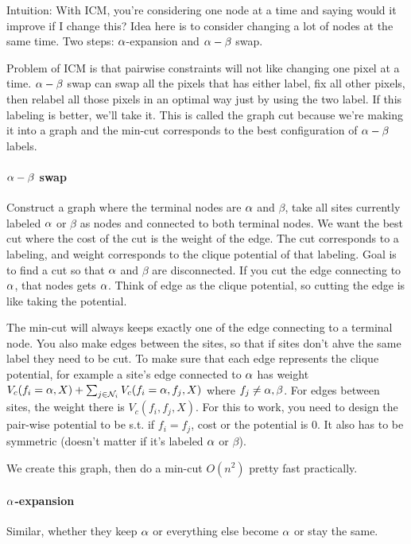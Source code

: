 Intuition: With ICM, you're considering one node at a time and saying
would it improve if I change this? Idea here is to consider changing a
lot of nodes at the same time.
Two steps: $\alpha$-expansion and $\alpha-\beta$ swap.

Problem of ICM is that pairwise constraints will not like changing one
pixel at a time. $\alpha-\beta$ swap can swap all the pixels that has
either label, fix all other pixels, then relabel all those pixels in an optimal way just by using
the two label. If this labeling is better, we'll take it.
This is called the graph cut because we're making it into a graph and
the min-cut corresponds to the best configuration of $\alpha-\beta$
labels.

\paragraph{$\alpha-\beta$ swap}
Construct a graph where the terminal nodes are $\alpha$ and $\beta$, take
all sites currently labeled $\alpha$ or $\beta$ as nodes and connected to
both terminal nodes. We want the best cut where the cost of the cut is the weight of the edge. The
cut corresponds to a labeling, and weight corresponds to the clique
potential of that labeling.
Goal is to find a cut so that $\alpha$ and $\beta$ are disconnected. If you cut the edge connecting to $\alpha$, that nodes gets $\alpha$. Think
 of edge as the clique potential, so cutting the edge is like taking
 the potential.

The min-cut will always keeps exactly one of the edge connecting to a
terminal node. You also make edges between the sites, so that if sites
don't ahve the same label they need to be cut.
To make sure that each edge represents the clique potential, for
example a site's edge connected to $\alpha$ has weight $V_c(f_i
= \alpha, X) + \sum_{j\in \mathcal{N}_i} V_c(f_i=\alpha, f_j, X)$ where
$f_j\neq \alpha, \beta$. For edges between sites, the weight there is
$V_c(f_i, f_j, X)$. For this to work, you need to design the pair-wise
potential to be s.t. if $f_i = f_j$, cost or the potential is 0. It
also has to be symmetric (doesn't matter if it's labeled $\alpha$ or
$\beta$). 

We create this graph, then do a min-cut $O(n^2)$ pretty fast
practically.

\paragraph{$\alpha$-expansion}
\label{sec:ah-expansion}
Similar, whether they keep $\alpha$ or everything else become $\alpha$ or
stay the same.

